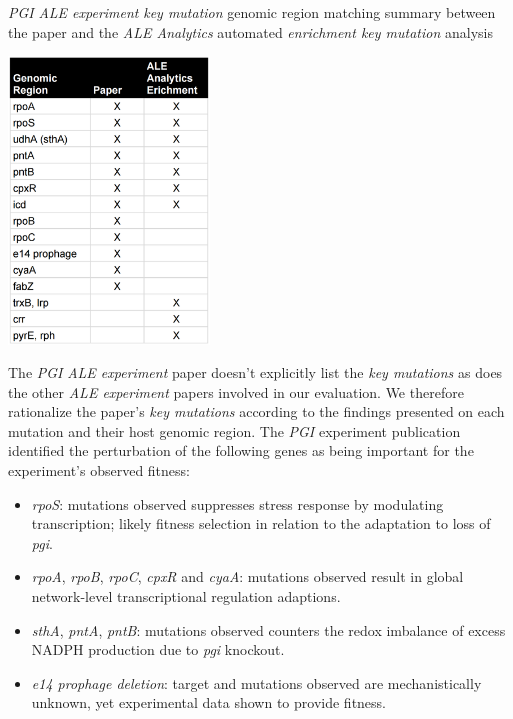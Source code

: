 \documentclass[12pt,final,masters,chapterheads]{ucsd}  %
\begin{document}
\begin{table}[H]
  \caption{\textit{PGI} \textit{ALE experiment} \textit{key mutation} genomic region matching summary between the paper and the \textit{ALE Analytics} automated \textit{enrichment key mutation} analysis}
  \centering
  \includegraphics[width=0.4\textwidth]{pgi_key_mutation_regions.png}
\end{table}
The \textit{PGI} \textit{ALE experiment} paper doesn't explicitly list the \textit{key mutations} as does the other\textit{ ALE experiment} papers involved in our evaluation. We therefore rationalize the paper's \textit{key mutations} according to the findings presented on each mutation and their host genomic region. The \textit{PGI} experiment publication identified the perturbation of the following genes as being important for the experiment's observed fitness:
\begin{itemize}
\item \textit{rpoS}: mutations observed suppresses stress response by modulating transcription; likely fitness selection in relation to the adaptation to loss of \textit{pgi}.
\item \textit{rpoA}, \textit{rpoB}, \textit{rpoC}, \textit{cpxR} and \textit{cyaA}: mutations observed result in global network-level transcriptional regulation adaptions.
\item \textit{sthA}, \textit{pntA}, \textit{pntB}: mutations observed counters the redox imbalance of excess NADPH production due to \textit{pgi} knockout.
\item \textit{e14 prophage deletion}: target and mutations observed are mechanistically unknown, yet experimental data shown to provide fitness.
\end{itemize}
\end{document}
